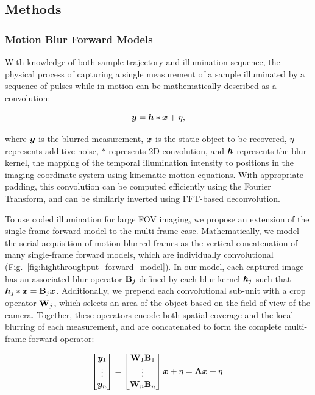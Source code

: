 \subsection{Methods}
\subsubsection{Motion Blur Forward Models}
With knowledge of both sample trajectory and illumination sequence, the physical process of capturing a single measurement of a sample illuminated by a sequence of pulses while in motion can be mathematically described as a convolution:

\begin{equation}
\label{eq:single_forward}
\bm{y} = \bm{h} * \bm{x} + {\eta},
\end{equation}

\noindent where $\bm{y}$ is the blurred measurement, $\bm{x}$ is the static object to be recovered, ${\eta}$ represents additive noise, $*$ represents 2D convolution, and $\bm{h}$ represents the blur kernel, the mapping of the temporal illumination intensity to positions in the imaging coordinate system using kinematic motion equations. With appropriate padding, this convolution can be computed efficiently using the Fourier Transform, and can be similarly inverted using FFT-based deconvolution.

To use coded illumination for large FOV imaging, we propose an extension of the single-frame forward model to the multi-frame case.
Mathematically, we model the serial acquisition of motion-blurred frames as the vertical concatenation of many single-frame forward models, which are individually convolutional (Fig.~\ref{fig:highthroughput_forward_model}).
In our model, each captured image has an associated blur operator $\mathbf{B}_j$ defined by each blur kernel $\bm{h}_j$ such that $\bm{h}_j * \bm{x} = \mathbf{B}_j \bm{x}$.
Additionally, we prepend each convolutional sub-unit with a crop operator $\mathbf{W}_j$, which selects an area of the object based on the field-of-view of the camera. Together, these operators encode both spatial coverage and the local blurring of each measurement, and are concatenated to form the complete multi-frame forward operator:

\begin{equation}
\label{eq:multiframe_forward}
\begin{bmatrix}\bm{y}_1\\ \vdots \\ \bm{y}_n \end{bmatrix} = \begin{bmatrix}\mathbf{W}_1\mathbf{B}_1 \\ \vdots \\ \mathbf{W}_n \mathbf{B}_n \end{bmatrix} \bm{x} + {\eta} = \mathbf{A}\bm{x} + {\eta}\:
\end{equation}

